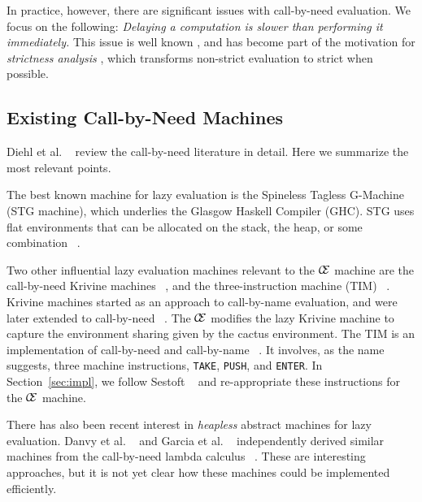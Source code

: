 In practice, however, there are significant issues with call-by-need evaluation.
We focus on the following: \emph{Delaying a computation is slower than
performing it immediately.} This issue is well known
\cite{johnsson1984efficient,jonesstg}, and has become part of the motivation
for \emph{strictness analysis}
\cite{mycroft1982abstract,wadler1987projections}, which transforms non-strict
evaluation to strict when possible.

\subsection{Existing Call-by-Need Machines}

Diehl et al. ~\cite{diehl2000abstract} review the call-by-need
literature in detail.  Here we summarize the most relevant points.

The best known machine for lazy evaluation is the Spineless Tagless
G-Machine (STG machine), which underlies the Glasgow Haskell Compiler (GHC). 
STG uses flat environments that can be allocated on the stack, the heap,
or some combination ~\cite{jonesstg}.  

Two other influential lazy evaluation machines relevant to the $\mathcal{\mathcal{C} \mskip -4mu \mathcal{E}}$
machine are the call-by-need Krivine machines
~\cite{lkm,krivine2007call,sestoft}, and the three-instruction machine (TIM)
~\cite{TIM}.  Krivine machines started as an approach to call-by-name
evaluation, and were later extended to call-by-need
~\cite{krivine2007call,sestoft,danvy2013synthetic,lkm}.  The $\mathcal{\mathcal{C} \mskip -4mu \mathcal{E}}$
modifies the lazy Krivine machine to capture the environment sharing given by
the cactus environment. The TIM is an implementation of call-by-need and
call-by-name ~\cite{TIM}.  It involves, as the name suggests, three machine
instructions, \texttt{TAKE}, \texttt{PUSH}, and \texttt{ENTER}. In
Section~\ref{sec:impl}, we follow Sestoft ~\cite{sestoft} and
re-appropriate these instructions for the $\mathcal{\mathcal{C} \mskip -4mu \mathcal{E}}$ machine.

There has also been recent interest in \emph{heapless} abstract
machines for lazy evaluation. Danvy et al. ~\cite{danvy2012inter} and
Garcia et al. ~\cite{garcia2009lazy} independently derived similar
machines from the call-by-need lambda calculus
~\cite{ariola1995call}. These are interesting approaches, but it is not yet
clear how these machines could be implemented efficiently.
